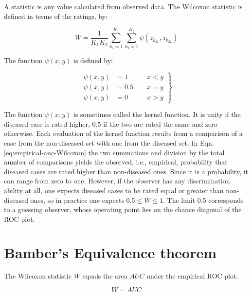 \documentclass[
]{book}
\begin{document}
A statistic is any value calculated from observed data. The Wilcoxon statistic is defined in terms of the ratings, by:

\begin{equation}
W=\frac{1}{K_1K_2} \sum_{k_1=1}^{K_1} \sum_{k_2=1}^{K_2} \psi\left ( z_{k_11} ,  z_{k_22} \right )
\label{eq:empirical-auc-Wilcoxon}
\end{equation}

The function \(\psi\left ( x, y \right )\) is defined by:

\begin{equation}
\left.
\begin{aligned}
\psi(x,y)&=1  \qquad & x<y \\
\psi(x,y)&=0.5  & x=y \\
\psi(x,y)&=0  & x>y
\end{aligned}
\right \}
\label{eq:empirical-auc-psi}
\end{equation}

The function \(\psi\left ( x, y \right )\) is sometimes called the kernel function. It is unity if the diseased case is rated higher, 0.5 if the two are rated the same and zero otherwise. Each evaluation of the kernel function results from a comparison of a case from the non-diseased set with one from the diseased set. In Eqn. \eqref{eq:empirical-auc-Wilcoxon} the two summations and division by the total number of comparisons yields the observed, i.e., empirical, probability that diseased cases are rated higher than non-diseased ones. Since it is a probability, it can range from zero to one. However, if the observer has any discrimination ability at all, one expects diseased cases to be rated equal or greater than non-diseased ones, so in practice one expects \(0.5 \leq W \leq 1\). The limit 0.5 corresponds to a guessing observer, whose operating point lies on the chance diagonal of the ROC plot.

\hypertarget{empirical-auc-wilcoxon-bamber-theorem}{%
\section{Bamber's Equivalence theorem}\label{empirical-auc-wilcoxon-bamber-theorem}}

The Wilcoxon statistic \(W\) equals the area \(AUC\) under the empirical ROC plot:

\begin{equation}
W = AUC
\label{eq:empirical-auc-BambersTheorem}
\end{equation}
\end{document}
